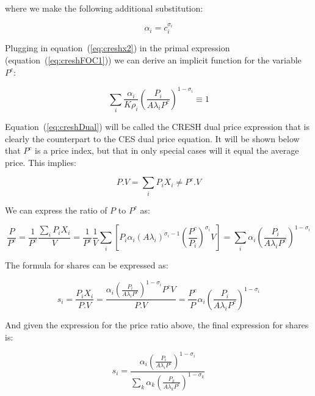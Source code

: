 \noindent where we make the following additional substitution:

\begin{displaymath}
\alpha_i = c_i^{\sigma_i}
\end{displaymath}

\noindent Plugging in equation~(\ref{eq:creshx2}) in the primal expression (equation~(\ref{eq:creshFOC1})) we can derive
an implicit function for the variable $P^c$:

\begin{equation}
\label{eq:creshDual}
\sum\limits_{i} { \frac{\alpha_i}{K \rho_i}\left( \frac {P_i} {A \lambda_i P^c}\right)^{1-\sigma_i}} \equiv 1
\end{equation}

\noindent Equation~(\ref{eq:creshDual}) will be called the CRESH dual price expression that is clearly the counterpart
to the CES dual price equation. It will be shown below that $P^c$ is a price index, but that in only special
cases will it equal the average price. This implies:

\begin{displaymath}
P.V = \sum_i{P_i X_i} \ne P^c.V
\end{displaymath}

\noindent We can express the ratio of $P$ to $P^c$ as:

\begin{displaymath}
\frac{P}{P^c} = \frac{1}{P^c} \frac{\sum_i{P_i X_i}}{V}
= \frac{1}{P^c} \frac{1}{V}
	\sum_i{ \left[ P_i \alpha_i \left( A \lambda_i \right)^{\sigma_i-1} \left( \frac{P^c} {P_i} \right)^{\sigma_i} V \right] }
= \sum_i{\alpha_i \left( \frac{P_i} {A \lambda_i P^c} \right)^{1-\sigma_i}}
\end{displaymath}

The formula for shares can be expressed as:

\begin{equation}
\label{eq:creshshare0}
s_i=\frac{P_i X_i}{P.V}=\frac{\alpha_i \left( \frac{P_i}{A \lambda_i P^c}\right)^{1-\sigma_i} P^c V} {P.V}
= \frac{P^c}{P} \alpha_i \left( \frac{P_i}{A \lambda_i P^c}\right)^{1-\sigma_i}
\end{equation}

\noindent And given the expression for the price ratio above, the final expression for shares is:

\begin{equation}
\label{eq:creshshare}
s_i=\frac{\displaystyle \alpha_i \left( \frac{P_i}{A \lambda_i P^c}\right)^{1-\sigma_i}}
{\displaystyle \sum_k{\alpha_k \left( \frac{P_k}{A \lambda_k P^c}\right)^{1-\sigma_k}}}
\end{equation}

